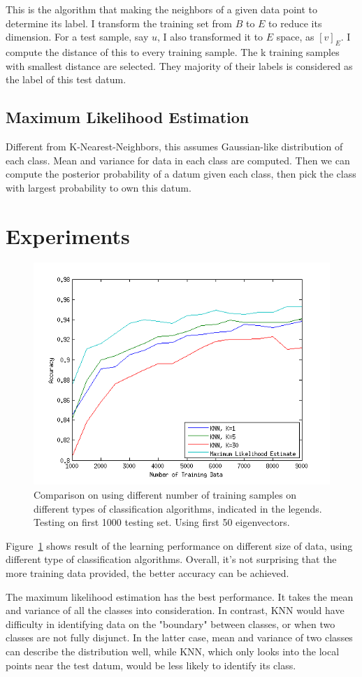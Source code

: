 \documentclass[10pt]{article}
\begin{document}
This is the algorithm that making the neighbors of a given data point
to determine its label. I transform the training set from $B$ to $E$ to
reduce its dimension. For a test sample, say $u$, I also transformed
it to $E$ space, as $[v]_E$. I compute the distance of this to every
training sample. The k training samples with smallest distance are
selected. They majority of their labels is considered as the label of
this test datum.

\subsection{Maximum Likelihood Estimation}

Different from K-Nearest-Neighbors, this assumes Gaussian-like
distribution of each class. Mean and variance for data in each class
are computed. Then we can compute the posterior probability of a datum
given each class, then pick the class with largest probability to own
this datum.

\section{Experiments}

\begin{figure}
\centering
\includegraphics[width=0.55\columnwidth]{diffDataSet.png}
\caption{Comparison on using different number of training samples on
different types of classification algorithms, indicated in the legends.
Testing on first 1000 testing set. Using first 50 eigenvectors.}
\label{fig:dataset}
\end{figure}

Figure~\ref{fig:dataset} shows result of the learning performance on
different size of data, using different type of classification
algorithms. Overall, it's not surprising that the more training data
provided, the better accuracy can be achieved.

The maximum likelihood estimation has the best performance. It takes
the mean and variance of all the classes into consideration. In
contrast, KNN would have difficulty in identifying data on the
"boundary" between classes, or when two classes are not fully
disjunct. In the latter case, mean and variance of two classes can
describe the distribution well, while KNN, which only looks into the
local points near the test datum, would be less likely to identify its
class.
\end{document}
